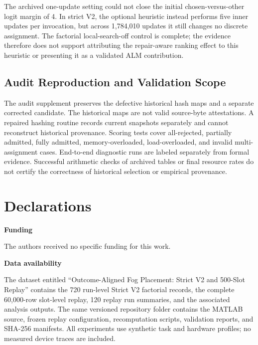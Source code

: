 \documentclass[pdflatex,sn-mathphys-num]{sn-jnl}
\begin{document}
\begin{appendices}
The archived one-update setting could not close the initial chosen-versus-other logit margin of 4. In strict V2, the optional heuristic instead performs five inner updates per invocation, but across 1,784,010 updates it still changes no discrete assignment. The factorial local-search-off control is complete; the evidence therefore does not support attributing the repair-aware ranking effect to this heuristic or presenting it as a validated ALM contribution.

\subsection{Audit Reproduction and Validation Scope}
The audit supplement preserves the defective historical hash maps and a separate corrected candidate. The historical maps are not valid source-byte attestations. A repaired hashing routine records current snapshots separately and cannot reconstruct historical provenance. Scoring tests cover all-rejected, partially admitted, fully admitted, memory-overloaded, load-overloaded, and invalid multi-assignment cases. End-to-end diagnostic runs are labeled separately from formal evidence. Successful arithmetic checks of archived tables or final resource rates do not certify the correctness of historical selection or empirical provenance.

\end{appendices}


\backmatter
\section*{Declarations}
\noindent\textbf{Funding}\par
The authors received no specific funding for this work.
\par\medskip

\noindent\textbf{Data availability}\par
The dataset entitled ``Outcome-Aligned Fog Placement: Strict V2 and 500-Slot Replay'' contains the 720 run-level Strict V2 factorial records, the complete 60,000-row slot-level replay, 120 replay run summaries, and the associated analysis outputs. The same versioned repository folder contains the MATLAB source, frozen replay configuration, recomputation scripts, validation reports, and SHA-256 manifests. All experiments use synthetic task and hardware profiles; no measured device traces are included.\par\medskip
\end{document}
